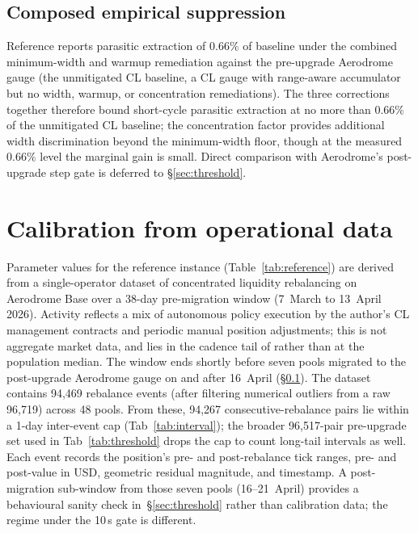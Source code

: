 \documentclass[11pt,a4paper]{article}
\theoremstyle{definition}
\theoremstyle{plain}
\theoremstyle{remark}
\begin{document}
\subsection{Composed empirical suppression}\label{sec:composed}

Reference\cite{ryan2026c} reports parasitic extraction of $0.66\%$ of baseline under the combined minimum-width and warmup remediation against the pre-upgrade Aerodrome gauge (the unmitigated CL baseline, a CL gauge with range-aware accumulator but no width, warmup, or concentration remediations). The three corrections together therefore bound short-cycle parasitic extraction at no more than $0.66\%$ of the unmitigated CL baseline; the concentration factor provides additional width discrimination beyond the minimum-width floor, though at the measured $0.66\%$ level the marginal gain is small. Direct comparison with Aerodrome's post-upgrade step gate is deferred to \S\ref{sec:threshold}.

\section{Calibration from operational data}\label{sec:calibration}

Parameter values for the reference instance (Table~\ref{tab:reference}) are derived from a single-operator dataset of concentrated liquidity rebalancing on Aerodrome Base over a 38-day pre-migration window (7~March to 13~April 2026). Activity reflects a mix of autonomous policy execution by the author's CL management contracts and periodic manual position adjustments; this is not aggregate market data, and lies in the cadence tail of \cite{heimbach2022} rather than at the population median. The window ends shortly before seven pools migrated to the post-upgrade Aerodrome gauge on and after 16~April (\S\ref{sec:composed}). The dataset contains 94{,}469 rebalance events (after filtering numerical outliers from a raw 96{,}719) across 48 pools. From these, 94{,}267 consecutive-rebalance pairs lie within a 1-day inter-event cap (Tab~\ref{tab:interval}); the broader 96{,}517-pair pre-upgrade set used in Tab~\ref{tab:threshold} drops the cap to count long-tail intervals as well. Each event records the position's pre- and post-rebalance tick ranges, pre- and post-value in USD, geometric residual magnitude, and timestamp. A post-migration sub-window from those seven pools (16--21~April) provides a behavioural sanity check in~\S\ref{sec:threshold} rather than calibration data; the regime under the 10\,s gate is different.
\end{document}
